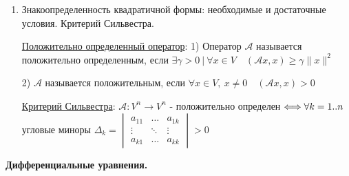 \documentclass[12pt]{article}
\begin{document}
\begin{enumerate}
        \item Знакоопределенность квадратичной формы: необходимые и достаточные условия. Критерий Сильвестра.

        \hyperlink{positivedefinedoperator}{Положительно определенный оператор}: 1) Оператор $\mathcal{A}$ называется положительно определенным, если
        $\exists \gamma > 0 \ | \ \forall x \in V \quad (\mathcal{A}x, x) \geq \gamma \|x\|^2$

        2) $\mathcal{A}$ называется положительным, если
        $\forall x \in V, \ x \neq 0 \quad (\mathcal{A}x, x) > 0$


        \hyperlink{criterionSilvester}{Критерий Сильвестра}: $\mathcal{A}: V^n \to V^n$ - положительно определен $\Longleftrightarrow \\ \forall k = 1..n $ угловые миноры $ \Delta_k =
        \begin{vmatrix}a_{11} & \dots & a_{1k} \\ \vdots & \ddots & \vdots \\ a_{k1} & \dots & a_{kk}\end{vmatrix} > 0$


    \end{enumerate}

    \begin{center}
        \textbf{Дифференциальные уравнения.}
    \end{center}
\end{document}

